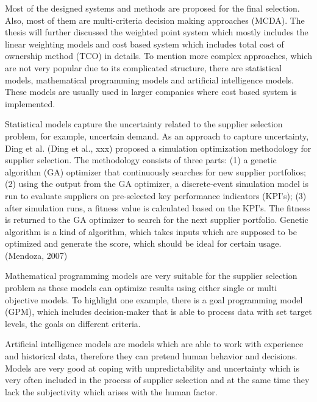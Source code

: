 \documentclass[oneside,12pt]{article}%
\begin{document}
Most of the designed systems and methods are proposed for the final selection. Also, most of them are multi-criteria decision making approaches (MCDA). The thesis will further discussed the weighted point system which mostly includes the linear weighting models and cost based system which includes total cost of ownership method (TCO) in details. To mention more complex approaches, which are not very popular due to its complicated structure, there are statistical models, mathematical programming models and artificial intelligence models. These models are usually used in larger companies where cost based system is implemented.\par
Statistical models capture the uncertainty related to the supplier selection problem, for example, uncertain demand. As an approach to capture uncertainty, Ding et al. (Ding et al., xxx) proposed a simulation optimization methodology for supplier selection. The methodology consists of three parts: (1) a genetic algorithm (GA) optimizer that continuously searches for new supplier portfolios; (2) using the output from the GA optimizer, a discrete-event simulation model is run to evaluate suppliers on pre-selected key performance indicators (KPI’s); (3) after simulation runs, a fitness value is calculated based on the KPI’s. The fitness is returned to the GA optimizer to search for the next supplier portfolio. Genetic algorithm is a kind of algorithm, which takes inputs which are supposed to be optimized and generate the score, which should be ideal for certain usage. (Mendoza, 2007)\par
Mathematical programming models are very suitable for the supplier selection problem as these models can optimize results using either single or multi objective models. To highlight one example, there is a goal programming model (GPM), which includes decision-maker that is able to process data with set target levels, the goals on different criteria. \par
Artificial intelligence models are models which are able to work with experience and historical data, therefore they can pretend human behavior and decisions. Models are very good at coping with unpredictability and uncertainty which is very often included in the process of supplier selection and at the same time they lack the subjectivity which arises with the human factor.


\end{document}
